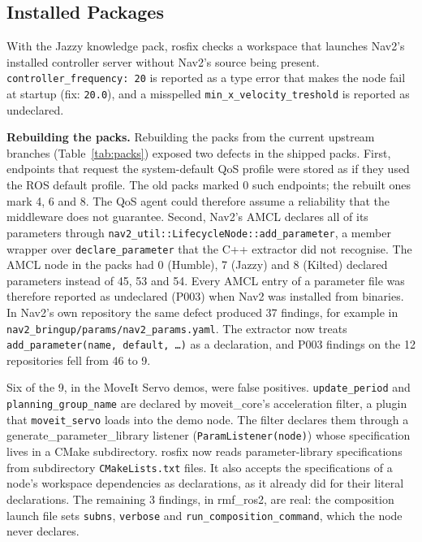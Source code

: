\documentclass[conference]{IEEEtran}
\newcommand{\code}[1]{\texttt{#1}}
\begin{document}
\subsection{Installed Packages}

With the Jazzy knowledge pack, rosfix checks a workspace that launches Nav2's installed
controller server without Nav2's source being present. \code{controller\_frequency: 20} is
reported as a type error that makes the node fail at startup (fix: \code{20.0}), and a misspelled
\code{min\_x\_velocity\_treshold} is reported as undeclared.

\textbf{Rebuilding the packs.} Rebuilding the packs from the current upstream branches
(Table~\ref{tab:packs}) exposed two defects in the shipped packs. First, endpoints that request
the system-default QoS profile were stored as if they used the ROS default profile. The old packs
marked 0 such endpoints; the rebuilt ones mark 4, 6 and 8. The QoS agent could therefore assume a
reliability that the middleware does not guarantee. Second, Nav2's AMCL declares all of its
parameters through \code{nav2\_util::LifecycleNode::add\_parameter}, a member wrapper over
\code{declare\_parameter} that the C++ extractor did not recognise. The AMCL node in the packs
had 0 (Humble), 7 (Jazzy) and 8 (Kilted) declared parameters instead of 45, 53 and 54. Every AMCL
entry of a parameter file was therefore reported as undeclared (P003) when Nav2 was installed
from binaries. In Nav2's own repository the same defect produced 37 findings, for example in
\code{nav2\_bringup/params/nav2\_params.yaml}. The extractor now treats
\code{add\_parameter(name, default, \dots)} as a declaration, and P003 findings on the 12
repositories fell from 46 to 9.

Six of the 9, in the MoveIt Servo demos, were false positives. \code{update\_period} and
\code{planning\_group\_name} are declared by moveit\_core's acceleration filter, a plugin that
\code{moveit\_servo} loads into the demo node. The filter declares them through a
generate\_parameter\_library listener (\code{ParamListener(node)}) whose specification lives in a
CMake subdirectory. rosfix now reads parameter-library specifications from subdirectory
\code{CMakeLists.txt} files. It also accepts the specifications of a node's workspace
dependencies as declarations, as it already did for their literal declarations. The remaining 3 findings, in
rmf\_ros2, are real: the composition launch file sets \code{subns}, \code{verbose} and
\code{run\_composition\_command}, which the node never declares.
\end{document}
